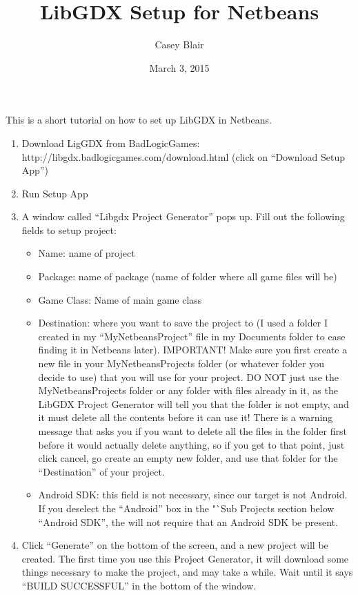 \documentclass[12pt]{article}
\begin{document}
\title{LibGDX Setup for Netbeans}
\date{March 3, 2015}
\author{Casey Blair}
\maketitle

\par
This is a short tutorial on how to set up LibGDX in Netbeans. 

\par
\begin{enumerate}

\item Download LigGDX from BadLogicGames: http://libgdx.badlogicgames.com/download.html (click on "`Download Setup App"')
\item Run Setup App
\item	A window called "`Libgdx Project Generator"' pops up. Fill out the following fields to setup project: \begin{itemize} 
\item	Name: name of project
\item	Package: name of package (name of folder where all game files will be)
\item	Game Class: Name of main game class
\item	Destination: where you want to save the project to (I used a folder I created in my "`MyNetbeansProject"' file in my Documents folder to ease finding it in Netbeans later).
IMPORTANT! Make sure you first create a new file in your MyNetbeansProjects folder (or whatever folder you decide to use) that you will use for your project. DO NOT just use the MyNetbeansProjects folder or any folder with files already in it, as the LibGDX Project Generator will tell you that the folder is not empty, and it must delete all the contents before it can use it! There is a warning message that asks you if you want to delete all the files in the folder first before it would actually delete anything, so if you get to that point, just click cancel, go create an empty new folder, and use that folder for the "`Destination"' of your project.  
\item	Android SDK: this field is not necessary, since our target is not Android. If you deselect the "`Android"' box in the "`Sub Projects section below "`Android SDK"', the will not require that an Android SDK be present.  
\end{itemize}
\item Click "`Generate"' on the bottom of the screen, and a new project will be created. The first time you use this Project Generator, it will download some things necessary to make the project, and may take a while. Wait until it says "`BUILD SUCCESSFUL"' in the bottom of the window. 

\end{enumerate}
\end{document}
